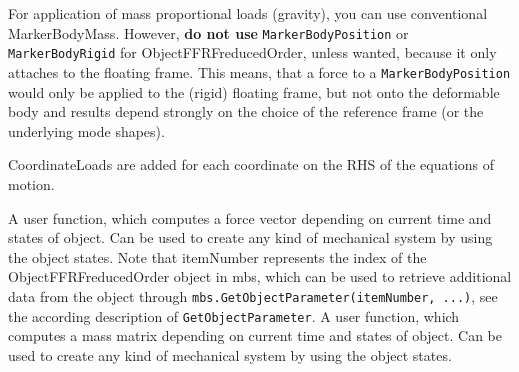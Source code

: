     For application of mass proportional loads (gravity), you can use conventional MarkerBodyMass.
    However, {\bf do not use} \texttt{MarkerBodyPosition} or \texttt{MarkerBodyRigid} for ObjectFFRFreducedOrder, unless wanted, because it only attaches to the floating
    frame. This means, that a force to a \texttt{MarkerBodyPosition} would only be applied to the (rigid) floating frame, but not onto the deformable body and
    results depend strongly on the choice of the reference frame (or the underlying mode shapes).
    
    CoordinateLoads are added for each  coordinate on the RHS of the equations of motion. 
    
    
    A user function, which computes a force vector depending on current time and states of object. Can be used to create any kind of mechanical system by using the object states.
    Note that itemNumber represents the index of the ObjectFFRFreducedOrder object in mbs, which can be used to retrieve additional data from the object through
    \texttt{mbs.GetObjectParameter(itemNumber, ...)}, see the according description of \texttt{GetObjectParameter}.
    \finishTable
    A user function, which computes a mass matrix depending on current time and states of object. Can be used to create any kind of mechanical system by using the object states.

